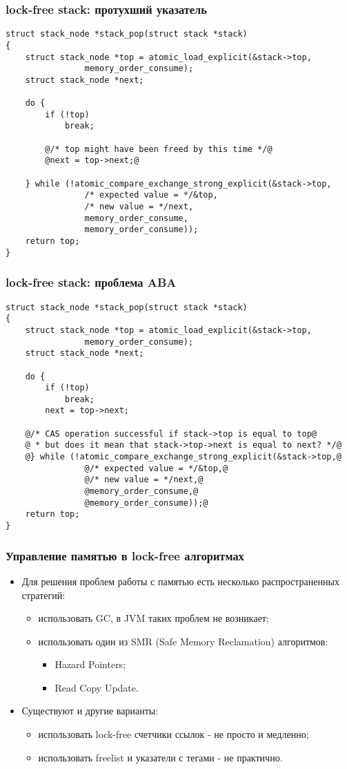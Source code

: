 \begin{frame}[fragile]
\frametitle{lock-free stack: протухший указатель}
\begin{lstlisting}[style=base]
struct stack_node *stack_pop(struct stack *stack)
{
	struct stack_node *top = atomic_load_explicit(&stack->top,
				memory_order_consume);
	struct stack_node *next;

	do {
		if (!top)
			break;

		@/* top might have been freed by this time */@
		@next = top->next;@

	} while (!atomic_compare_exchange_strong_explicit(&stack->top,
				/* expected value = */&top,
				/* new value = */next,
				memory_order_consume,
				memory_order_consume));
	return top;
}
\end{lstlisting}
\end{frame}

\begin{frame}[fragile]
\frametitle{lock-free stack: проблема ABA}
\begin{lstlisting}[style=base]
struct stack_node *stack_pop(struct stack *stack)
{
	struct stack_node *top = atomic_load_explicit(&stack->top,
				memory_order_consume);
	struct stack_node *next;

	do {
		if (!top)
			break;
		next = top->next;

	@/* CAS operation successful if stack->top is equal to top@
	@ * but does it mean that stack->top->next is equal to next? */@
	@} while (!atomic_compare_exchange_strong_explicit(&stack->top,@
				@/* expected value = */&top,@
				@/* new value = */next,@
				@memory_order_consume,@
				@memory_order_consume));@
	return top;
}
\end{lstlisting}
\end{frame}

\begin{frame}
\frametitle{Управление памятью в lock-free алгоритмах}
\begin{itemize}
  \item Для решения проблем работы с памятью есть несколько распространенных
  стратегий:
  \begin{itemize}
    \item использовать GC, в JVM таких проблем не возникает;
    \item использовать один из SMR (Safe Memory Reclamation) алгоритмов:
    \begin{itemize}
      \item Hazard Pointers;
      \item Read Copy Update.
    \end{itemize}
  \end{itemize}
  \item Существуют и другие варианты:
  \begin{itemize}
    \item использовать lock-free счетчики ссылок - не просто и медленно;
    \item использовать freelist и указатели с тегами - не практично.
  \end{itemize}
\end{itemize}
\end{frame}
